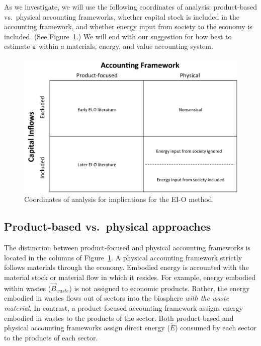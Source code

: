 As we investigate, we will use the following
coordinates of analysis:
product-based vs.\ physical accounting frameworks,
whether capital stock is included in the accounting framework, and
whether energy input from society to the economy is included.
(See Figure~\ref{fig:coords_of_analysis}.)
We will end with our suggestion for how best to estimate
$\boldsymbol{\varepsilon}$ within
a materials, energy, and value accounting system.

\begin{figure}[!ht]
\centering{}
\includegraphics[width=0.8\linewidth]{Part_3/Chapter_Implications/Images/Grid.pdf}
\caption[Coordinates of analysis for implications for the I-O method]{Coordinates of analysis for implications for the EI-O method.}
\label{fig:coords_of_analysis}
\end{figure}


\subsection{Product-based vs.\ physical approaches}
\label{sec:prod_vs_physical}

The distinction between product-focused and physical
accounting frameworks is located in the columns
of Figure~\ref{fig:coords_of_analysis}.
A physical accounting framework strictly follows materials 
through the economy. 
Embodied energy is accounted with the material stock or material flow
in which it resides.
For example, energy embodied within wastes ($\vec{B}_{waste}$) 
is not assigned to economic products. 
Rather, the energy embodied in wastes flows out of sectors 
into the biosphere \emph{with the waste material}.
In contrast, a product-focused accounting framework assigns 
energy embodied in wastes to the products of the sector.
Both product-based and physical accounting frameworks
assign direct energy ($\dot{E}$) consumed by each sector
to the products of each sector.

